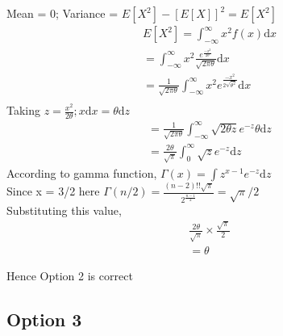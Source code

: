 \documentclass[12pt]{article}
\begin{document}
Mean = 0; Variance = $E[X^{2}] - [E[X]]^{2} = E[X^{2}]$\\
\begin{align*}
 E[X^{2}] =  \int_{-\infty}^{\infty}{x^{2}f(x)\mathrm{d}x}   \\
          = \int_{-\infty}^{\infty}{x^{2}\frac{e^{\frac{-x^{2}}{2{\theta}}}}{\sqrt{2\pi\theta}}\mathrm{d}x} \\
          = \frac{1}{\sqrt{2\pi\theta}}\int_{-\infty}^{\infty}{x^{2}{e^{\frac{-x^{2}}{2\sqrt{{\theta}^{2}}}}}\mathrm{d}x}\\
\end{align*}
Taking $z = \frac{x^{2}}{2\theta}; x\mathrm{d}x = \theta\mathrm{d}z$\\
\begin{align*}
    = \frac{1}{\sqrt{2\pi\theta}}\int_{-\infty}^{\infty}{\sqrt{2{\theta}z}{e^{-z}}\theta\mathrm{d}z} \\
    = \frac{2\theta}{\sqrt{\pi}}\int_{0}^{\infty}{\sqrt{z}{e^{-z}}\mathrm{d}z} %
\end{align*}
According to gamma function, $\Gamma(x) = \int{z^{x-1}e^{-z}\mathrm{d}z}$\\
Since x = 3/2 here $\Gamma(n/2) = \frac{(n-2)!!\sqrt{\pi}}{2^{\frac{n-1}{2}}} = \sqrt{\pi}/2$\\
Substituting this value,\\
\begin{align*}
    \frac{2\theta}{\sqrt{\pi}}\times\frac{\sqrt{\pi}}{2} \\ = \theta
\end{align*}

Hence Option 2 is correct
\subsection{Option 3}
\end{document}
